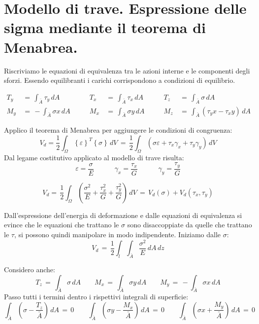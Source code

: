\section{Modello di trave. Espressione delle sigma mediante il teorema di Menabrea.}

Riscriviamo le equazioni di equivalenza tra le azioni interne e le componenti degli sforzi. Essendo equilibranti i carichi corrispondono a condizioni di equilibrio.

\begin{align*}
    T_y \, &=\, \int_{\bar{A}} \tau_y \, dA 
    &\quad\quad T_x \, &=\, \int_{\bar{A}} \tau_x \, dA 
    &\quad\quad T_z \, &=\, \int_{\bar{A}} \sigma \, dA \\
    M_y \, &=\, - \int_{\bar{A}} \sigma x \, dA 
    &\quad\quad M_x \, &=\,  \int_{\bar{A}} \sigma y \, dA 
    &\quad\quad M_z \, &=\, \int_{\bar{A}} ( \tau_y x - \tau_x y ) \, dA
\end{align*}

Applico il teorema di Menabrea per aggiungere le condizioni di congruenza:
\begin{equation*}
    V_d = \frac{1}{2} \int_\Omega  \left\{\varepsilon\right\}^T \left\{\sigma\right\}\, dV \,=\, \frac{1}{2} \int_\Omega  \left(  \sigma\varepsilon + \tau_x\gamma_x + \tau_y\gamma_y \right)\,dV
\end{equation*}
Dal legame costitutivo applicato al modello di trave risulta:
\begin{equation*}
    \varepsilon = \frac{\sigma}{E} \quad \quad \quad \gamma_x = \frac{\tau_x}{G} \quad \quad \quad \gamma_y = \frac{\tau_y}{G} 
\end{equation*}

\begin{equation*}
    V_d =\, \frac{1}{2} \int_\Omega  \left(  \frac{\sigma^2}{E} +  \frac{\tau_x^2}{G}  +\frac{\tau_y^2}{G}  \right)\,dV 
   \, =\, V_d(\sigma) + V_d(\tau_x,\tau_y)
\end{equation*}

Dall'espressione dell'energia di deformazione e dalle equazioni di equivalenza si evince che le equazioni che trattano le $\sigma$ sono disaccoppiate da quelle che trattano le $\tau$, si possono quindi manipolare in modo indipendente. Iniziamo dalle $\sigma$:
\begin{equation*}
    V_d  \,=\, \frac{1}{2} \int_l  \int_{\bar{A}}   \frac{\sigma^2}{E} \,dA\,dz
\end{equation*}


Considero anche:
\begin{equation*}
     T_z \, =\, \int_{\bar{A}} \sigma \, dA \quad\quad M_x \, =\,  \int_{\bar{A}} \sigma y \, dA\quad\quad M_y \, =\, - \int_{\bar{A}} \sigma x \, dA
\end{equation*}
Passo tutti i termini dentro i rispettivi integrali di superficie:
\begin{equation*}
      \int_{\bar{A}} \left(\sigma-\frac{T_z}{\bar{A}}\right) \, dA\, =\, 0 \quad\quad
      \int_{\bar{A}} \left(\sigma y-\frac{M_x}{\bar{A}}\right) \, dA\, =\, 0\quad\quad 
      \int_{\bar{A}} \left(\sigma x+\frac{M_y}{\bar{A}}\right) \, dA\, =\, 0
\end{equation*}

